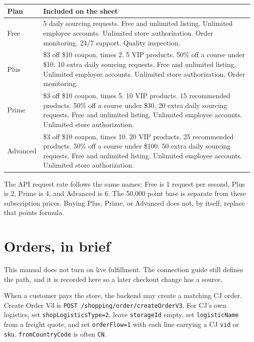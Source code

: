 \documentclass[11pt]{article}
\begin{document}
\begin{center}
\small
\begin{tabular}{@{}p{3.2cm}p{11cm}@{}}
\toprule
Plan & Included on the sheet \\
\midrule
Free &
5 daily sourcing requests.
Free and unlimited listing.
Unlimited employee accounts.
Unlimited store authorization.
Order monitoring.
24/7 support.
Quality inspection. \\
\addlinespace
Plus &
\$3 off \$10 coupon, times 2.
5 VIP products.
50\% off a course under \$10.
10 extra daily sourcing requests.
Free and unlimited listing.
Unlimited employee accounts.
Unlimited store authorization.
Order monitoring. \\
\addlinespace
Prime &
\$3 off \$10 coupon, times 5.
10 VIP products.
15 recommended products.
50\% off a course under \$30.
20 extra daily sourcing requests.
Free and unlimited listing.
Unlimited employee accounts.
Unlimited store authorization. \\
\addlinespace
Advanced &
\$3 off \$10 coupon, times 10.
20 VIP products.
25 recommended products.
50\% off a course under \$100.
50 extra daily sourcing requests.
Free and unlimited listing.
Unlimited employee accounts.
Unlimited store authorization. \\
\bottomrule
\end{tabular}
\end{center}

The API request rate follows the same names: Free is 1 request per second, Plus is 2, Prime is 4, and Advanced is 6. The 50{,}000 point base is separate from these subscription prices. Buying Plus, Prime, or Advanced does not, by itself, replace that points formula.

\section{Orders, in brief}

This manual does not turn on live fulfillment. The connection guide still defines the path, and it is recorded here so a later checkout change has a source.

When a customer pays the store, the backend may create a matching CJ order. Create Order V3 is \texttt{POST /shopping/order/createOrderV3}. For CJ's own logistics, set \texttt{shopLogisticsType=2}, leave \texttt{storageId} empty, set \texttt{logisticName} from a freight quote, and set \texttt{orderFlow=1} with each line carrying a CJ \texttt{vid} or \texttt{sku}. \texttt{fromCountryCode} is often \texttt{CN}.
\end{document}
